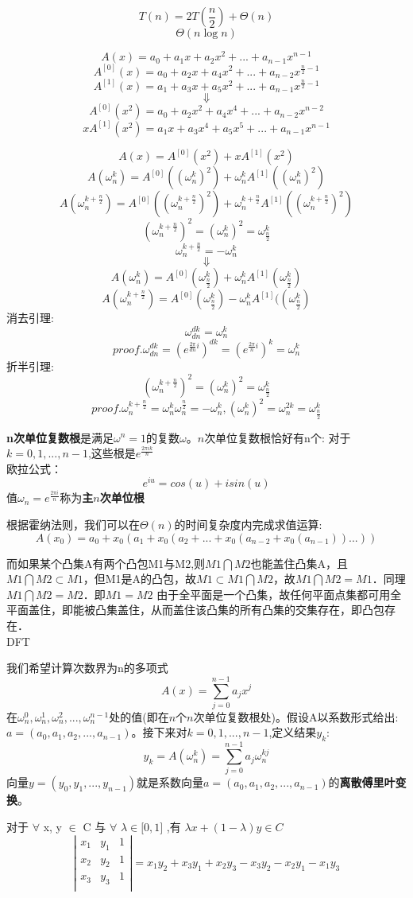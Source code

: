 \documentclass{article}
\begin{document}
\noindent $$T(n) = 2T(\frac{n}{2}) + \Theta(n)$$
$$\Theta(n\log{n})$$

$$A(x) = a_0 + a_1x + a_2x^2 + ... + a_{n-1}x^{n-1}$$
$$A^{[0]}(x) = a_0 + a_2x + a_4x^2 + ... + a_{n-2}x^{\frac{n}{2}-1}$$
$$A^{[1]}(x) = a_1 + a_3x + a_5x^2 + ... + a_{n-1}x^{\frac{n}{2}-1}$$
$$\Downarrow$$
$$A^{[0]}(x^2) = a_0 + a_2x^2 + a_4x^4 + ... + a_{n-2}x^{n-2}$$
$$xA^{[1]}(x^2) = a_1x + a_3x^4 + a_5x^5 + ... + a_{n-1}x^{n-1}$$


$$A(x) = A^{[0]}(x^2) + x A^{[1]}(x^2)$$
$$A(\omega^k_n) = A^{[0]}((\omega^k_n)^2) + \omega^k_n A^{[1]}((\omega^k_n)^2)$$
$$A(\omega^{k + \frac{n}{2}}_n) = A^{[0]}((\omega^{k + \frac{n}{2}}_n)^2) + \omega^{k + \frac{n}{2}}_n A^{[1]}((\omega^{k + \frac{n}{2}}_n)^2)$$
$$(\omega^{k + \frac{n}{2}}_n)^2 = (\omega^k_n)^2 = \omega^k_{\frac{n}{2}}$$
$$\omega^{k + \frac{n}{2}}_n = -\omega^{k}_{n}$$
$$\Downarrow$$
$$A(\omega^k_n) = A^{[0]}(\omega^k_{\frac{n}{2}}) + \omega^k_n A^{[1]}(\omega^k_{\frac{n}{2}})$$
$$A(\omega^{k + \frac{n}{2}}_n) = A^{[0]}(\omega^k_{\frac{n}{2}}) - \omega^{k}_n A^{[1]}((\omega^{k}_{\frac{n}{2}})$$
消去引理:$$\omega^{dk}_{dn} = \omega^k_n$$
$$proof.\omega^{dk}_{dn} = (e^{\frac{2\pi}{dn}i})^{dk}= (e^{\frac{2\pi}{n}i})^k=\omega^k_n$$
折半引理:$$(\omega^{k+\frac{n}{2}}_n)^2 = (\omega^k_n)^2 = \omega^k_{\frac{n}{2}}$$
$$proof. \omega^{k + \frac{n}{2}}_n = \omega^k_n\omega^{\frac{n}{2}}_n = -\omega^k_n, (\omega^k_n)^2 = \omega^{2k}_n = \omega^k_{\frac{n}{2}}$$

\textbf{n次单位复数根}是满足$\omega^n=1$的复数$\omega$。$n$次单位复数根恰好有n个: 对于$k=0,1,...,n-1$,这些根是$e^{\frac{2\pi ik}{n}}$\\
欧拉公式：
    $$e^{iu}=cos(u)+isin(u)$$
值$\omega_n=e^{\frac{2\pi i}{n}}$称为\textbf{主$n$次单位根}

根据霍纳法则，我们可以在$\Theta(n)$的时间复杂度内完成求值运算:  
$$A(x_0) = a_0+x_0(a_1+x_0(a_2+...+x_0(a_{n-2}+x_0(a_{n-1}))...))$$

而如果某个凸集A有两个凸包M1与M2,则$M1 \bigcap M2$也能盖住凸集A，且$M1 \bigcap M2 \subset M1$，但M1是A的凸包，故$ M1 \subset M1 \bigcap M2$，故$M1 \bigcap M2 = M1$．同理$M1 \bigcap M2 = M2$．即$M1 = M2$
由于全平面是一个凸集，故任何平面点集都可用全平面盖住，即能被凸集盖住，从而盖住该凸集的所有凸集的交集存在，即凸包存在． \\
\noindent DFT  

\noindent 我们希望计算次数界为n的多项式  
$$A(x) = \sum^{n-1}_{j=0}a_jx^j$$
在$\omega^0_n,\omega^1_n,\omega^2_n,...,\omega^{n-1}_n$处的值(即在$n$个$n$次单位复数根处)。假设A以系数形式给出:$a = (a_0,a_1,a_2,...,a_{n-1})$。接下来对$k=0,1,...,n-1$,定义结果$y_k$:
$$y_k=A(\omega^k_n)=\sum^{n-1}_{j=0}a_j\omega^{kj}_{n}$$
向量$y=(y_0,y_1,...,y_{n-1})$就是系数向量$a = (a_0,a_1,a_2,...,a_{n-1})$的\textbf{离散傅里叶变换}。
\par 对于 $\forall$ x, y $\in$ C 与 $\forall$  $\lambda\in \lbrack 0, 1 \rbrack $ ,有
$\lambda x + (1-\lambda)y \in C$
$$
\left|
\begin{matrix}
x_1 & y_1 & 1 \\
x_2 & y_2 & 1 \\
x_3 & y_3 & 1 \\
\end{matrix}
\right| = x_1y_2+x_3y_1+x_2y_3-x_3y_2-x_2y_1-x_1y_3
$$
\end{document}
